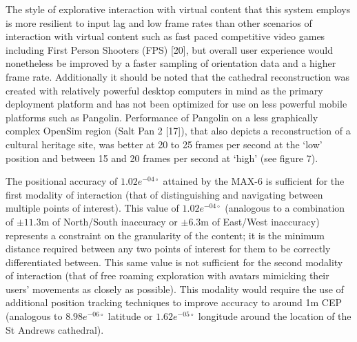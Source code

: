 The style of explorative interaction with virtual content that this system employs is more resilient to input lag and low frame rates than other scenarios of interaction with virtual content such as fast paced competitive video games including First Person Shooters (FPS) [20], but overall user experience would nonetheless be improved by a faster sampling of orientation data and a higher frame rate. Additionally it should be noted that the cathedral reconstruction was created with relatively powerful desktop computers in mind as the primary deployment platform and has not been optimized for use on less powerful mobile platforms such as Pangolin. Performance of Pangolin on a less graphically complex OpenSim region (Salt Pan 2 [17]), that also depicts a reconstruction of a cultural heritage site, was better at 20 to 25 frames per second at the `low' position and between 15 and 20 frames per second at `high' (see figure 7).


The positional accuracy of $1.02e^{-04\circ}$ attained by the MAX-6 is sufficient for the first modality of interaction (that of distinguishing and navigating between multiple points of interest). This value of $1.02e^{-04\circ}$ (analogous to a combination of $\pm11.3$m of North/South inaccuracy or $\pm6.3$m of East/West inaccuracy) represents a constraint on the granularity of the content; it is the minimum distance required between any two points of interest for them to be correctly differentiated between. This same value is not sufficient for the second modality of interaction (that of free roaming exploration with avatars mimicking their users' movements as closely as possible). This modality would require the use of additional position tracking techniques to improve accuracy to around 1m CEP (analogous to $8.98e^{-06\circ}$ latitude or $1.62e^{-05\circ}$ longitude around the location of the St Andrews cathedral).

